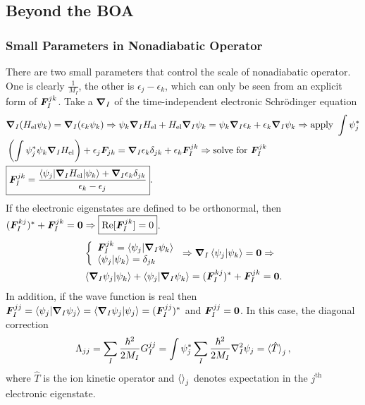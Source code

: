 \subsection{Beyond the BOA}

\subsubsection{Small Parameters in Nonadiabatic Operator}
There are two small parameters that control the scale of nonadiabatic operator. One is clearly $\frac{1}{M_I}$, the other is $\epsilon_j-\epsilon_k$, which can only be seen from an explicit form of $\boldsymbol{F}_I^{jk}$. Take a $\boldsymbol{\nabla}_I$ of the time-independent electronic Schr\"odinger equation
\begin{align}
&\boldsymbol{\nabla}_I(H_{\text{el}}\psi_k) = \boldsymbol{\nabla}_I(\epsilon_k\psi_k ) \Rightarrow \psi_k\boldsymbol{\nabla}_IH_{\text{el}} + H_{\text{el}}\boldsymbol{\nabla}_I\psi_k = \psi_k\boldsymbol{\nabla}_I\epsilon_k + \epsilon_k\boldsymbol{\nabla}_I\psi_k \Rightarrow \nonumber \text{apply }\int\psi_j^* \\ &\left(\int \psi_j^*\psi_k\boldsymbol{\nabla}_IH_{\text{el}}\right) + \epsilon_j \boldsymbol{F}_{jk} = \boldsymbol{\nabla}_I\epsilon_k \delta_{jk}+\epsilon_k\boldsymbol{F}_I^{jk} \Rightarrow \nonumber \text{solve for }\boldsymbol{F}_I^{jk} \\
& \boxed{ \boldsymbol{F}_I^{jk} = \dfrac{\braket{\psi_j|\boldsymbol{\nabla}_IH_{\text{el}}|\psi_k}+\boldsymbol{\nabla}_I\epsilon_k\delta_{jk}}{\epsilon_k-\epsilon_j} }.
\end{align}
If the electronic eigenstates are defined to be orthonormal, then $(\boldsymbol{F}_I^{kj})^*+\boldsymbol{F}_I^{jk}=\boldsymbol{0} \Rightarrow \boxed{\text{Re}[\boldsymbol{F}_I^{jk}]=0}$. 
\begin{align}
&\left\{\begin{array}{l}
\boldsymbol{F}^{jk}_I = \braket{\psi_j|\boldsymbol{\nabla}_I\psi_k} \\
\braket{\psi_j|\psi_k} = \delta_{jk}
\end{array}\right. \Rightarrow \boldsymbol{\nabla}_I \braket{\psi_j|\psi_k} = \boldsymbol{0} \nonumber \Rightarrow \\
& \braket{\boldsymbol{\nabla}_I\psi_j|\psi_k} + \braket{\psi_j|\boldsymbol{\nabla}_I\psi_k}   = (\boldsymbol{F}_I^{kj})^*+\boldsymbol{F}_I^{jk} = \boldsymbol{0}.
\end{align}
In addition, if the wave function is real then $\boldsymbol{F}_I^{jj}=\braket{\psi_j|\boldsymbol{\nabla}_I\psi_j} = \braket{\boldsymbol{\nabla}_I\psi_j|\psi_j} = (\boldsymbol{F}_I^{jj})^*$ and $\boldsymbol{F}_I^{jj}=\boldsymbol{0}$. In this case, the diagonal correction
\begin{align}
\Lambda_{jj} = \sum_I \frac{\hbar^2}{2M_I}G_I^{jj} = \int \psi_j^* \sum_I \frac{\hbar^2}{2M_I} \nabla^2_I\psi_j = \braket{\hat{T}}_j,
\end{align}
where $\hat{T}$ is the ion kinetic operator and $\braket{}_j$ denotes expectation in the $j^{\text{th}}$ electronic eigenstate.

